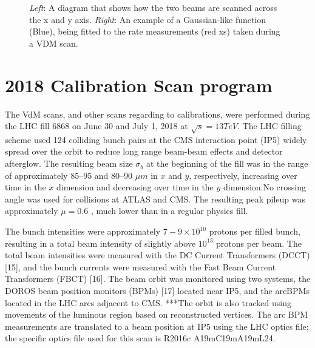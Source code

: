 \begin{figure}[ht]
\begin{minipage}[b]{0.5\linewidth}

\end{minipage}
\caption[vdM scan process.]{\textit{Left}: A diagram that shows how the two beams are scanned across the x and y axis. \textit{ Right}: An example of a Gaussian-like function (Blue), being fitted to the rate measurements (red xs) taken during a VDM scan.}
\label{vdm1}
\end{figure}


\section{2018 Calibration Scan program}
The VdM scans, and other scans regarding to calibrations, were performed during the LHC fill 6868 on June 30 and July 1, 2018 at $\sqrt{s}=13TeV$. The LHC filling scheme used 124 colliding bunch pairs at the CMS interaction point (IP5) widely spread over the orbit to reduce long range beam-beam effects and detector afterglow. The resulting beam size $\sigma_{b}$ at the beginning of the fill was in the range of approximately 85–95 and 80–90 $\mu m$ in $x$ and $y$, respectively, increasing over time in the $x$ dimension and decreasing over time in the $y$ dimension.No crossing angle was used for collisions at ATLAS and CMS. The resulting peak pileup was approximately $\mu = 0.6$ , much lower than in a regular physics fill.

The bunch intensities were approximately $7-9 \times 10^{10} $ protons per filled bunch, resulting in a total beam intensity of slightly above $10^{13}$ protons per beam. The total beam intensities were measured with the DC Current Transformers (DCCT) [15], and the bunch currents were measured with the Fast Beam Current Transformers (FBCT) [16]. The beam orbit was monitored using two systems, the DOROS beam position monitors (BPMs) [17] located near IP5, and the arcBPMs located in the LHC arcs adjacent to CMS.  ***The orbit is also tracked using movements of the luminous region based on reconstructed vertices. The arc BPM measurements are translated to a beam position at IP5 using the LHC optics file; the specific optics file used for this scan is R2016c A19mC19mA19mL24.

